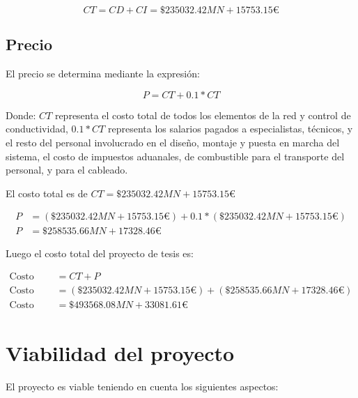 \begin{equation}
CT = CD + CI = \$235032.42MN + 15753.15€
\end{equation}

\subsection{Precio}

El precio se determina mediante la expresión:

\begin{equation}
P = CT + 0.1 * CT
\end{equation}

Donde: $CT$ representa el costo total de todos los elementos de la red y control de conductividad, $0.1*CT$ representa los salarios pagados a especialistas, técnicos, y el resto del personal involucrado en el diseño, montaje y puesta en marcha del sistema, el costo de impuestos aduanales, de combustible para el transporte del personal, y para el cableado.

El costo total es de $CT = \$235032.42MN + 15753.15€$

\begin{align*}
P &= ( \$235032.42MN + 15753.15€) + 0.1*( \$235032.42MN + 15753.15€) \\
P &= \$258535.66MN + 17328.46€
\end{align*}

Luego el costo total del proyecto de tesis es: 

\begin{align*}
\text{Costo total del proyecto de tesis} &= CT + P \\
\text{Costo total del proyecto de tesis} &= (\$235032.42MN + 15753.15€) + (\$258535.66MN + 17328.46€) \\
\text{Costo total del proyecto de tesis} &= \$493568.08MN + 33081.61€
\end{align*}


\section{Viabilidad del proyecto}

El proyecto es viable teniendo en cuenta los siguientes aspectos:

